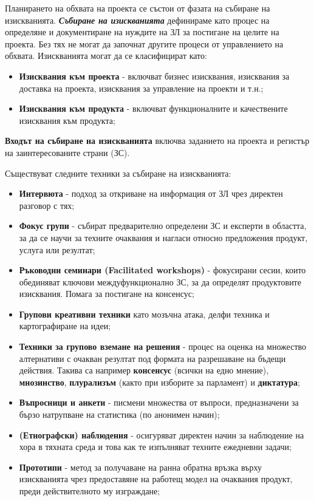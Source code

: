 \documentclass[fleqn,12pt]{article}
\begin{document}
Планирането на обхвата на проекта се състои от фазата на събиране на изискванията.
\textbf{\textit{Събиране на изискванията}} дефинираме като процес на определяне и документиране на нуждите на ЗЛ за постигане на целите на проекта.
Без тях не могат да започнат другите процеси от управлението на обхвата.
Изискванията могат да се класифицират като:
\begin{itemize}
    \item \textbf{Изисквания към проекта} - включват бизнес изисквания, изисквания за доставка на проекта, изисквания за управление на проекти и т.н.;
    \item \textbf{Изисквания към продукта} - включват функционалните и качествените изисквания към продукта;
\end{itemize}

\textbf{Входът на събиране на изискванията} включва заданието на проекта и регистър на заинтересованите страни (ЗС).
\bigbreak

Съществуват следните техники за събиране на изискванията:
\begin{itemize}
    \item \textbf{Интервюта} - подход за откриване на информация от ЗЛ чрез директен разговор с тях;
    \item \textbf{Фокус групи} - събират предварително определени ЗС и експерти в областта, за да се научи за техните очаквания и нагласи относно предложения продукт, услуга или резултат;
    \item \textbf{Ръководни семинари (Facilitated workshops)} - фокусирани сесии, които обединяват ключови междуфункционално ЗС, за да определят продуктовите изисквания. Помага за постигане на консенсус;
    \item \textbf{Групови креативни техники} като мозъчна атака, делфи техника и картографиране на идеи;
    \item \textbf{Техники за групово вземане на решения} - процес на оценка на множество алтернативи с очакван резултат под формата на разрешаване на бъдещи действия.
    Такива са например \textbf{консенсус} (всички на едно мнение), \textbf{мнозинство}, \textbf{плурализъм} (както при изборите за парламент) и \textbf{диктатура};
    \item \textbf{Въпросници и анкети} - писмени множества от въпроси, предназначени за бързо натрупване на статистика (по анонимен начин);
    \item \textbf{(Етнографски) наблюдения} - осигуряват директен начин за наблюдение на хора в тяхната среда и това как те изпълняват техните ежедневни задачи;
    \item \textbf{Прототипи} - метод за получаване на ранна обратна връзка върху изискванията чрез предоставяне на работещ модел на очаквания продукт, преди действителното му изграждане;
\end{itemize}
\end{document}
